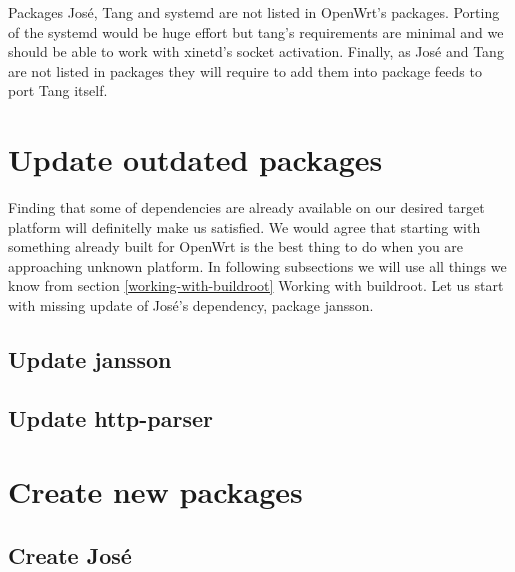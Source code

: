 Packages José, Tang and systemd are not listed in OpenWrt's packages.
Porting of the systemd would be huge effort but tang's requirements are minimal and we should be able to work with xinetd's socket activation.
Finally, as José and Tang are not listed in packages they will require to add them into package feeds to port Tang itself.

\section{Update outdated packages}

Finding that some of dependencies are already available on our desired target platform will definitelly make us satisfied.
We would agree that starting with something already built for OpenWrt is the best thing to do when you are approaching unknown platform.
In following subsections we will use all things we know from section \ref{working-with-buildroot} Working with buildroot.
Let us start with missing update of José's dependency, package jansson.

\subsection{Update jansson}
\newpage

\subsection{Update http-parser}
\newpage

\section{Create new packages}
\newpage

\subsection{Create José}
\newpage
